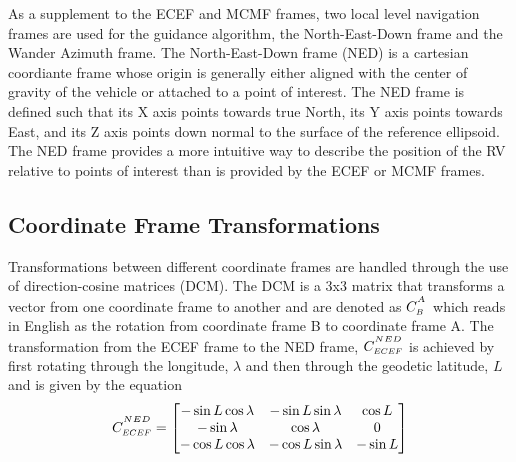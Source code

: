 \documentclass[12pt]{article}
\numberwithin{equation}{section}
\numberwithin{figure}{section}
\numberwithin{table}{section}
\begin{document}
As a supplement to the ECEF and MCMF frames, two local level navigation frames are used for the guidance algorithm, the North-East-Down frame and the Wander Azimuth frame. The North-East-Down frame (NED) is a cartesian coordiante frame whose origin is generally either aligned with the center of gravity of the vehicle or attached to a point of interest. The NED frame is defined such that its X axis points towards true North, its Y axis points towards East, and its Z axis points down normal to the surface of the reference ellipsoid. The NED frame provides a more intuitive way to describe the position of the RV relative to points of interest than is provided by the ECEF or MCMF frames.


\subsection{Coordinate Frame Transformations}
Transformations between different coordinate frames are handled through the use of direction-cosine matrices (DCM). The DCM is a 3x3 matrix that transforms a vector from one coordinate frame to another and are denoted as $C^{^{\scaleto{A}{4pt}}}_{\scaleto{B}{4pt}}$ which reads in English as the rotation from coordinate frame B to coordinate frame A.
The transformation from the ECEF frame to the NED frame, $C^{^{\scaleto{NED}{4pt}}}_{\scaleto{ECEF}{4pt}}$ is achieved by first rotating through the longitude, $\lambda$ and then through the geodetic latitude, $L$ and is given by the equation
\begin{align}
  C^{^{\scaleto{NED}{4pt}}}_{\scaleto{ECEF}{4pt}} = \begin{bmatrix}
    -\sin L \cos {\lambda} & -\sin L \sin {\lambda} & \cos L \\
    -\sin {\lambda} & \cos {\lambda} & 0 \\
    -\cos L \cos {\lambda} & -\cos L \sin {\lambda} & -\sin L
  \end{bmatrix}
\end{align}
\end{document}
